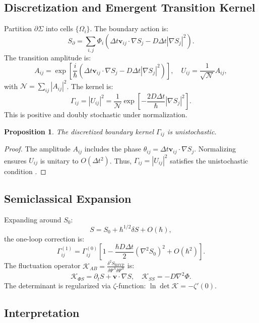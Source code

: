 \documentclass[12pt]{article}
\newtheorem{proposition}{Proposition}
\begin{document}
\subsection{Discretization and Emergent Transition Kernel}

Partition \(\partial \Sigma\) into cells \(\{\Omega_i\}\). The boundary action is:
\[
S_{\partial} = \sum_{i,j} \Phi_i \left( \Delta t \mathbf{v}_{ij} \cdot \nabla S_j - D \Delta t |\nabla S_j|^2 \right).
\]
The transition amplitude is:
\[
A_{ij} = \exp\left[ \frac{i}{\hbar} \left( \Delta t \mathbf{v}_{ij} \cdot \nabla S_j - D \Delta t |\nabla S_j|^2 \right) \right], \quad U_{ij} = \frac{1}{\sqrt{\mathcal{N}}} A_{ij},
\]
with \(\mathcal{N} = \sum_{ij} |A_{ij}|^2\). The kernel is:
\[
\Gamma_{ij} = |U_{ij}|^2 = \frac{1}{\mathcal{N}} \exp\left[ -\frac{2 D \Delta t}{\hbar} |\nabla S_j|^2 \right].
\]
This is positive and doubly stochastic under normalization.

\begin{proposition}
\label{prop:kernel}
The discretized boundary kernel \(\Gamma_{ij}\) is unistochastic.
\end{proposition}

\begin{proof}
The amplitude \(A_{ij}\) includes the phase \(\theta_{ij} = \Delta t \mathbf{v}_{ij} \cdot \nabla S_j\). Normalizing ensures \(U_{ij}\) is unitary to \(O(\Delta t^2)\). Thus, \(\Gamma_{ij} = |U_{ij}|^2\) satisfies the unistochastic condition \citep{Zyczkowski1994}.
\end{proof}

\subsection{Semiclassical Expansion}

Expanding around \(S_0\):
\[
S = S_0 + \hbar^{1/2} \delta S + O(\hbar),
\]
the one-loop correction is:
\[
\Gamma_{ij}^{(1)} = \Gamma_{ij}^{(0)} \left[ 1 - \frac{\hbar D \Delta t}{2} (\nabla^2 S_0)^2 + O(\hbar^2) \right].
\]
The fluctuation operator \(\mathcal{K}_{AB} = \frac{\delta^2 S_{\mathrm{RSVP}}}{\delta \Psi^A \delta \Psi^B}\) is:
\[
\mathcal{K}_{\Phi S} = \partial_t S + \mathbf{v} \cdot \nabla S, \quad \mathcal{K}_{S S} = -D \nabla^2 \Phi.
\]
The determinant is regularized via \(\zeta\)-function: \(\ln \det \mathcal{K} = -\zeta'(0)\).

\subsection{Interpretation}
\end{document}
